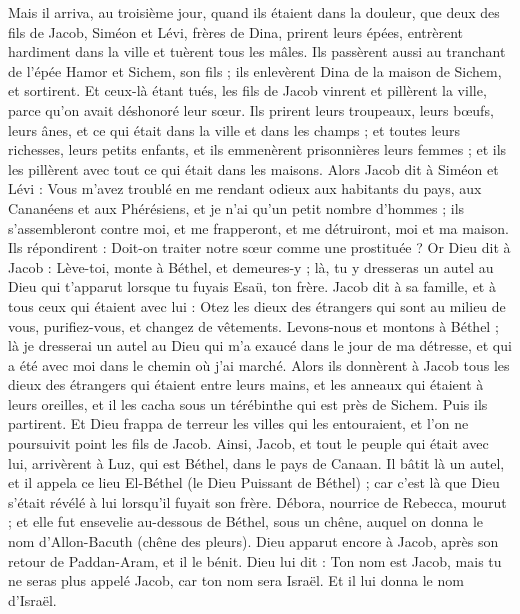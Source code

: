 \begin{multicols}{2}
Mais il arriva, au troisième jour, quand ils étaient dans la douleur, que deux des fils de Jacob, Siméon et Lévi, frères de Dina, prirent leurs épées, entrèrent hardiment dans la ville et tuèrent tous les mâles.
Ils passèrent aussi au tranchant de l'épée Hamor et Sichem, son fils ; ils enlevèrent Dina de la maison de Sichem, et sortirent.
Et ceux-là étant tués, les fils de Jacob vinrent et pillèrent la ville, parce qu'on avait déshonoré leur sœur.
Ils prirent leurs troupeaux, leurs bœufs, leurs ânes, et ce qui était dans la ville et dans les champs ;
et toutes leurs richesses, leurs petits enfants, et ils emmenèrent prisonnières leurs femmes ; et ils les pillèrent avec tout ce qui était dans les maisons.
Alors Jacob dit à Siméon et Lévi : Vous m'avez troublé en me rendant odieux aux habitants du pays, aux Cananéens et aux Phérésiens, et je n'ai qu'un petit nombre d'hommes ; ils s'assembleront contre moi, et me frapperont, et me détruiront, moi et ma maison.
Ils répondirent : Doit-on traiter notre sœur comme une prostituée ?
\VerseOne{}Or Dieu dit à Jacob : Lève-toi, monte à Béthel, et demeures-y ; là, tu y dresseras un autel au Dieu qui t'apparut lorsque tu fuyais Esaü, ton frère.
Jacob dit à sa famille, et à tous ceux qui étaient avec lui : Otez les dieux des étrangers qui sont au milieu de vous, purifiez-vous, et changez de vêtements.
Levons-nous et montons à Béthel ; là je dresserai un autel au Dieu qui m'a exaucé dans le jour de ma détresse, et qui a été avec moi dans le chemin où j'ai marché.
Alors ils donnèrent à Jacob tous les dieux des étrangers qui étaient entre leurs mains, et les anneaux qui étaient à leurs oreilles, et il les cacha sous un térébinthe qui est près de Sichem.
Puis ils partirent. Et Dieu frappa de terreur les villes qui les entouraient, et l'on ne poursuivit point les fils de Jacob.
Ainsi, Jacob, et tout le peuple qui était avec lui, arrivèrent à Luz, qui est Béthel, dans le pays de Canaan.
Il bâtit là un autel, et il appela ce lieu El-Béthel (le Dieu Puissant de Béthel) ; car c'est là que Dieu s'était révélé à lui lorsqu'il fuyait son frère.
Débora, nourrice de Rebecca, mourut ; et elle fut ensevelie au-dessous de Béthel, sous un chêne, auquel on donna le nom d'Allon-Bacuth (chêne des pleurs).
Dieu apparut encore à Jacob, après son retour de Paddan-Aram, et il le bénit.
Dieu lui dit : Ton nom est Jacob, mais tu ne seras plus appelé Jacob, car ton nom sera Israël. Et il lui donna le nom d'Israël.

\end{multicols}
